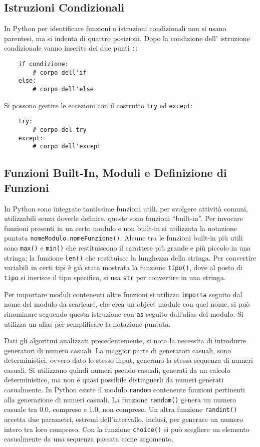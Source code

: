 \documentclass{article}
\numberwithin{equation}{subsection}
\begin{document}
\subsection{Istruzioni Condizionali}

In Python per identificare funzioni o istruzioni condizionali non si usano parentesi, ma si indenta di quattro posizioni. Dopo la condizione dell'
istruzione condizionale vanno inserite dei due punti \verb|:|:
\begin{verbatim}
    if condizione: 
        # corpo dell'if
    else:
        # corpo dell'else
\end{verbatim}


Si possono gestire le eccezioni con il costrutto \verb|try| ed \verb|except|:
\begin{verbatim}
    try:
        # corpo del try
    except:
        # corpo dell'except
\end{verbatim}

\subsection{Funzioni Built-In, Moduli e Definizione di Funzioni}

In Python sono integrate tantissime funzioni utili, per svolgere attività comuni, utilizzabili senza doverle definire, queste sono funzioni ``built-in''. 
Per invocare funzioni presenti in un certo modulo e non built-in si utilizzata la notazione puntata \verb|nomeModulo.nomeFunzione()|. Alcune tra le funzioni 
built-in più utili sono \verb|max()| e \verb|min()| che restituiscono il carattere più grande e più piccolo in una stringa; la funzione \verb|len()| che restituisce 
la lunghezza della stringa. Per convertire variabili in certi tipi è già stata mostrata la funzione \verb|tipo()|, dove al posto di \verb|tipo| si inerisce il 
tipo specifico, si usa \verb|str| per convertire in una stringa. 

Per importare moduli contenenti altre funzioni si utilizza \verb|importa| seguito dal nome del modulo da scaricare, che crea un object module con quel nome, si può 
rinominare seguendo questa istruzione con \verb|as| seguito dall'alias del modulo. Si utilizza un alias per semplificare la notazione puntata. 


Dati gli algoritmi analizzati precedentemente, si nota la necessita di introdurre generatori di numero casuali. La maggior parte di generatori casuali, sono deterministici, 
ovvero dato lo stesso input, generano la stessa sequenza di numeri casuali. Si utilizzano quindi numeri pseudo-casuali, generati da un calcolo deterministico, ma non è quasi possibile 
distinguerli da numeri generati casualmente. In Python esiste il modulo \verb|random| contenente funzioni pertinenti alla generazione di numeri casuali. La 
funzione \verb|random()| genera un numero casuale tra 0.0, compreso e 1.0, non compreso. Un altra funzione \verb|randint()| accetta due parametri, estremi 
dell'intervallo, inclusi, per generare un numero intero tra loro compreso. Con la funzione \verb|choice()| si può scegliere un elemento casualmente da una sequenza 
passata come argomento. 
\end{document}
